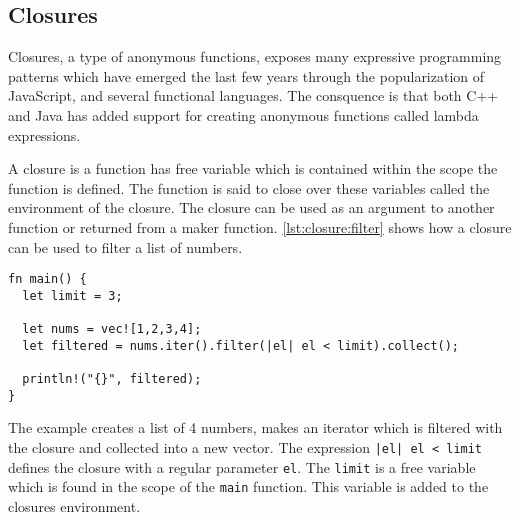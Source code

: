 \subsection{Closures}
\label{sec:back:rust:closures}

Closures, a type of anonymous functions, exposes many expressive programming patterns which have emerged the last few years through the popularization of JavaScript, and several functional languages.
The consquence is that both C++ and Java has added support for creating anonymous functions called lambda expressions.

A closure is a function has free variable which is contained within the scope the function is defined.
The function is said to close over these variables called the environment of the closure.
The closure can be used as an argument to another function or returned from a maker function.
\autoref{lst:closure:filter} shows how a closure can be used to filter a list of numbers.

\begin{listing}[H]
  \begin{verbatim}
fn main() {
  let limit = 3;

  let nums = vec![1,2,3,4];
  let filtered = nums.iter().filter(|el| el < limit).collect();

  println!("{}", filtered);
}
  \end{verbatim}
  \caption{}
  \label{lst:closure:filter}
\end{listing}

The example creates a list of 4 numbers, makes an iterator which is filtered with the closure and collected into a new vector.
The expression \texttt{|el| el < limit} defines the closure with a regular parameter \texttt{el}.
The \texttt{limit} is a free variable which is found in the scope of the \texttt{main} function.
This variable is added to the closures environment.
